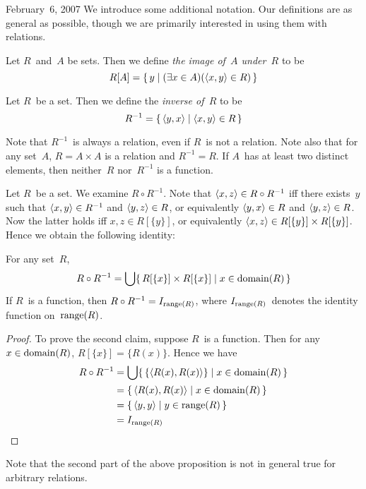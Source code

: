 \begin{lecture}{February~6, 2007}
We introduce some additional notation. Our definitions are as general as possible, though we are primarily interested in using them with relations.
\begin{defn}
Let \(R\)~and~\(A\) be sets. Then we define \emph{the image of~\(A\) under~\(R\)} to be
\[R[A]=\{\,y\mid(\exists x\in A)(\langle{x},{y}\rangle\in R)\,\}\]
\end{defn}
\begin{defn}
Let \(R\)~be a set. Then we define the \emph{inverse of~\(R\)} to be
\[R^{-1}=\{\,\langle{y},{x}\rangle\mid\langle{x},{y}\rangle\in R\,\}\]
\end{defn}
\noindent Note that \(R^{-1}\)~is always a relation, even if \(R\)~is not a relation. Note also that for any set~\(A\), \(R=A\times A\) is a relation and \(R^{-1}=R\). If \(A\)~has at least two distinct elements, then neither~\(R\) nor~\(R^{-1}\) is a function.

Let \(R\)~be a set. We examine \(R\circ R^{-1}\). Note that \(\langle{x},{z}\rangle\in R\circ R^{-1}\) iff there exists~\(y\) such that \(\langle{x},{y}\rangle\in R^{-1}\) and \(\langle{y},{z}\rangle\in R\), or equivalently \(\langle{y},{x}\rangle\in R\) and \(\langle{y},{z}\rangle\in R\). Now the latter holds iff \(x,z\in R[\{y\}]\), or equivalently \(\langle{x},{z}\rangle\in R[\{y\}]\times R[\{y\}]\). Hence we obtain the following identity:
\begin{prop}
For any set~\(R\),
\[R\circ R^{-1}=\bigcup\{\,R[\{x\}]\times R[\{x\}]\mid x\in\operatorname{domain}(R)\,\}\]
If \(R\)~is a function, then \(R\circ R^{-1}=I_{\operatorname{range}(R)}\), where \(I_{\operatorname{range}(R)}\)~denotes the identity function on~\(\operatorname{range}(R)\).
\end{prop}
\begin{proof}
To prove the second claim, suppose \(R\)~is a function. Then for any \(x\in\operatorname{domain}(R)\), \(R[\{x\}]=\{R(x)\}\). Hence we have
\begin{align*}
R\circ R^{-1}&=\bigcup\{\,\{\langle{R(x)},{R(x)}\rangle\}\mid x\in\operatorname{domain}(R)\,\}\\
	&=\{\,\langle{R(x)},{R(x)}\rangle\mid x\in\operatorname{domain}(R)\,\}\\
	&=\{\,\langle{y},{y}\rangle\mid y\in\operatorname{range}(R)\,\}\\
	&=I_{\operatorname{range}(R)}
\end{align*}
\end{proof}
\noindent Note that the second part of the above proposition is not in general true for arbitrary relations.


\end{lecture}
